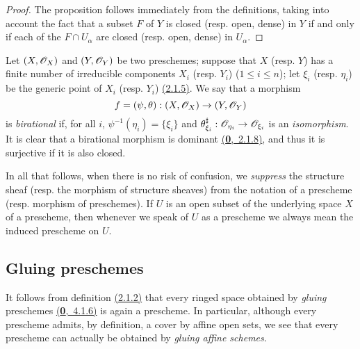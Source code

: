 \begin{proof}
\label{proof-prop-1.2.2.8}
The proposition follows immediately from the definitions, taking into
account the fact that a subset $F$ of $Y$ is closed (resp. open, dense) in $Y$
if and only if each of the $F\cap U_\alpha$ are closed (resp. open, dense) in
$U_\alpha$.
\end{proof}

\begin{env}[2.2.9]
\label{env-1.2.2.9}
Let $(X,\mathscr{O}_X)$ and $(Y,\mathscr{O}_Y)$ be two preschemes; suppose that
$X$ (resp. $Y$) has a finite number of irreducible components $X_i$ (resp.
$Y_i$) ($1\leqslant i\leqslant n$); let $\xi_i$ (resp. $\eta_i$) be the generic
point of $X_i$ (resp. $Y_i$) \hyperref[prop-1.2.1.5]{(2.1.5)}. We say that a morphism
\[
  f=(\psi,\theta):(X,\mathscr{O}_X)\to(Y,\mathscr{O}_Y)
\]
is {\em birational} if, for all $i$, $\psi^{-1}(\eta_i)=\{\xi_i\}$ and
$\theta_{\xi_i}^\sharp:\mathscr{O}_{\eta_i}\to\mathscr{O}_{\xi_i}$ is an {\em isomorphism}. It
is clear that a birational morphism is dominant \hyperref[env-0.2.1.8]{(\textbf{0},~2.1.8)}, and
thus it is surjective if it is also closed.
\end{env}

\begin{nota}[2.2.10]
\label{nota-1.2.2.10}
In all that follows, when there is
no risk of confusion, we {\em suppress} the structure sheaf (resp. the morphism
of structure sheaves) from the notation of a prescheme (resp. morphism of
preschemes). If $U$ is an open subset of the underlying space $X$ of a
prescheme, then whenever we speak of $U$ as a prescheme we always mean the
induced prescheme on $U$.
\end{nota}

\subsection{Gluing preschemes}
\label{subsection-gluing-preschemes}

\begin{env}[2.3.1]
\label{env-1.2.3.1}
It follows from definition \hyperref[defn-1.2.1.2]{(2.1.2)} that every ringed space obtained by
{\em gluing} preschemes \hyperref[env-0.4.1.6]{(\textbf{0},~4.1.6)} is again a prescheme. In particular, although
every prescheme admits, by definition, a cover by affine open sets, we see that every
prescheme can actually be obtained by {\em gluing affine schemes}.
\end{env}

